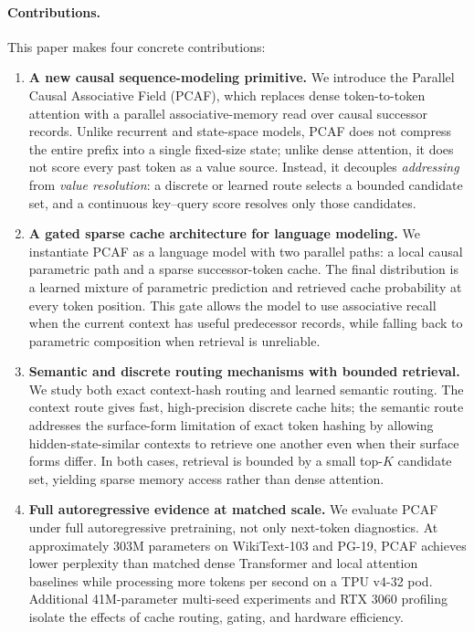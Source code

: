 \documentclass[11pt]{article}
\begin{document}
\paragraph{Contributions.}
This paper makes four concrete contributions:
\begin{enumerate}
  \item \textbf{A new causal sequence-modeling primitive.}
  We introduce the Parallel Causal Associative Field (PCAF), which replaces
  dense token-to-token attention with a parallel associative-memory read over
  causal successor records. Unlike recurrent and state-space models, PCAF does
  not compress the entire prefix into a single fixed-size state; unlike dense
  attention, it does not score every past token as a value source. Instead, it
  decouples \emph{addressing} from \emph{value resolution}: a discrete or
  learned route selects a bounded candidate set, and a continuous key--query
  score resolves only those candidates.

  \item \textbf{A gated sparse cache architecture for language modeling.}
  We instantiate PCAF as a language model with two parallel paths: a local
  causal parametric path and a sparse successor-token cache. The final
  distribution is a learned mixture of parametric prediction and retrieved
  cache probability at every token position. This gate allows the model to use
  associative recall when the current context has useful predecessor records,
  while falling back to parametric composition when retrieval is unreliable.

  \item \textbf{Semantic and discrete routing mechanisms with bounded
  retrieval.}
  We study both exact context-hash routing and learned semantic routing. The
  context route gives fast, high-precision discrete cache hits; the semantic
  route addresses the surface-form limitation of exact token hashing by allowing
  hidden-state-similar contexts to retrieve one another even when their surface
  forms differ. In both cases, retrieval is bounded by a small top-$K$ candidate
  set, yielding sparse memory access rather than dense attention.

  \item \textbf{Full autoregressive evidence at matched scale.}
  We evaluate PCAF under full autoregressive pretraining, not only next-token
  diagnostics. At approximately 303M parameters on WikiText-103 and PG-19,
  PCAF achieves lower perplexity than matched dense Transformer and local
  attention baselines while processing more tokens per second on a TPU v4-32
  pod. Additional 41M-parameter multi-seed experiments and RTX 3060 profiling
  isolate the effects of cache routing, gating, and hardware efficiency.
\end{enumerate}
\end{document}
